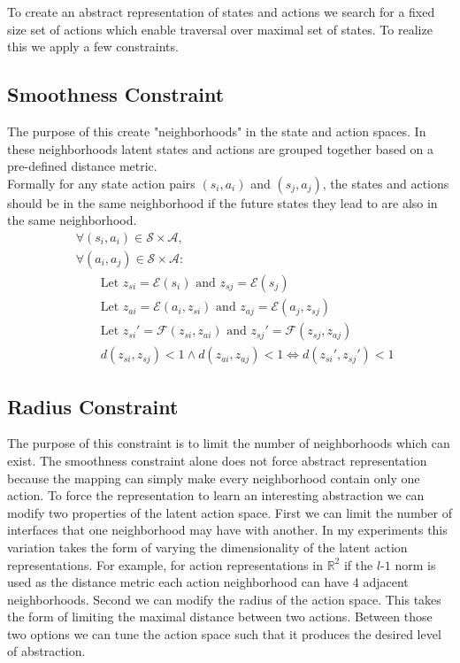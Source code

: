 \documentclass{article}
\begin{document}
To create an abstract representation of states and actions we search for a fixed size set of actions which enable traversal over maximal set of states.
To realize this we apply a few constraints.

\subsection*{Smoothness Constraint}

The purpose of this create "neighborhoods" in the state and action spaces.
In these neighborhoods latent states and actions are grouped together based on a pre-defined distance metric.\\

\noindent
Formally for any state action pairs $(s_i, a_i)$ and $(s_j, a_j)$, the states and actions should be in the same neighborhood if the future states they lead to are also in the same neighborhood.
\begin{align*}
     & \forall (s_i, a_i) \in \mathcal{S} \times \mathcal{A},                                                      \\
     & \forall (a_i, a_j) \in \mathcal{S} \times \mathcal{A}:                                                      \\
     & \qquad \text{Let } z_{si} = \mathcal{E}(s_i) \text{ and } z_{sj} = \mathcal{E}(s_j)                         \\
     & \qquad \text{Let } z_{ai} = \mathcal{E}(a_i, z_{si}) \text{ and } z_{aj} = \mathcal{E}(a_j, z_{sj})         \\
     & \qquad \text{Let } z_{si}' = \mathcal{F}(z_{si}, z_{ai}) \text{ and } z_{sj}' = \mathcal{F}(z_{sj}, z_{aj}) \\
     & \qquad d(z_{si}, z_{sj}) < 1 \land d(z_{ai}, z_{aj}) < 1 \iff d(z_{si}', z_{sj}') < 1
\end{align*}



\subsection*{Radius Constraint}

The purpose of this constraint is to limit the number of neighborhoods which can exist.
The smoothness constraint alone does not force abstract representation because the mapping can simply make every neighborhood contain only one action.
To force the representation to learn an interesting abstraction we can modify two properties of the latent action space.
First we can limit the number of interfaces that one neighborhood may have with another.
In my experiments this variation takes the form of varying the dimensionality of the latent action representations.
For example, for action representations in $\mathbb{R}^2$ if the $l$-$1$ norm is used as the distance metric each action neighborhood can have 4 adjacent neighborhoods.
Second we can modify the radius of the action space.
This takes the form of limiting the maximal distance between two actions.
Between those two options we can tune the action space such that it produces the desired level of abstraction.\\
\end{document}
